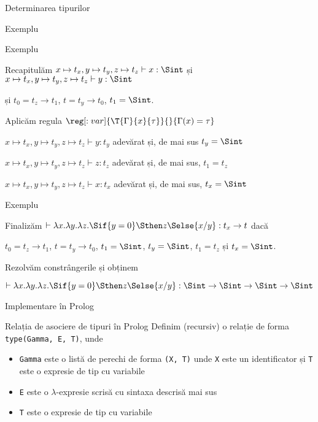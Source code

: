 \documentclass[xcolor=x11names,compress,10pt]{beamer}
\begin{document}
\begin{section}{Determinarea tipurilor}
\begin{subsection}{Exemplu}
\begin{frame}{Exemplu}
\begin{block}{Recapitulăm}
        $x \mapsto t_x, y\mapsto t_y, z \mapsto t_z \vdash x : \Sint$ \hfill și \hfill
        $x \mapsto t_x, y\mapsto t_y, z \mapsto t_z \vdash y : \Sint$

        și
        $t_0 = t_z \rightarrow t_1$, $t = t_y \rightarrow t_0$, $t_1 = \Sint$.
      \end{block}
        \begin{block}{Aplicăm regula 
     $\reg[:var]{\T{\Gamma}{x}{\tau}}{}{\Gamma(x) = \tau}$
    }

    $x \mapsto t_x, y\mapsto t_y, z \mapsto t_z \vdash y : t_y$ adevărat și, de mai sus $t_y = \Sint$

    $x \mapsto t_x, y\mapsto t_y, z \mapsto t_z \vdash {z} : t_z$ adevărat și, de mai sus, $t_1 = t_z$

    $x \mapsto t_x, y\mapsto t_y, z \mapsto t_z \vdash x : t_x$ adevărat și, de mai sus, $t_x = \Sint$

        \end{block}
      \end{frame}

      \begin{frame}{Exemplu}
      \begin{block}{Finalizăm}
        $\vdash  \lambda x.\lambda y. \lambda z. \Sif {y = 0} \Sthen z \Selse {x / y} : t_x \rightarrow t$ dacă

        $t_0 = t_z \rightarrow t_1$, $t = t_y \rightarrow t_0$, $t_1 = \Sint$, $t_y = \Sint$,
        $t_1 = t_z$ și $t_x = \Sint$.

      \end{block}
       \begin{block}{Rezolvăm constrângerile și obținem}

        $\vdash  \lambda x.\lambda y. \lambda z. \Sif {y = 0} \Sthen z \Selse {x / y} : {\Sint} \rightarrow {\Sint} \rightarrow {\Sint} \rightarrow {\Sint}$

        \end{block}
      \end{frame}

      
    \end{subsection}

    \begin{subsection}{Implementare în Prolog}



    \begin{frame}{Relația de asociere de tipuri în Prolog}
    Definim (recursiv) o relație de forma {\tt type(Gamma, E, T)}, unde
    \begin{itemize}
      \item {\tt Gamma} este o listă de perechi de forma {\tt (X, T)} unde
       {\tt X} este un identificator și {\tt T} este o expresie de tip cu variabile
      \item {\tt E} este o $\lambda$-expresie scrisă cu sintaxa descrisă mai sus
      \item {\tt T} este o expresie de tip cu variabile
    \end{itemize}
    \end{frame}


\end{subsection}
\end{section}
\end{document}
